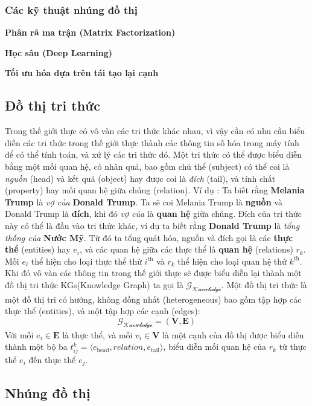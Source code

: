 \subsubsection{Các kỹ thuật nhúng đồ thị}

\textbf{Phân rã ma trận (Matrix Factorization)}

\textbf{Học sâu (Deep Learning)}

\textbf{Tối ưu hóa dựa trên tái tạo lại cạnh}

\subsection{Đồ thị tri thức}

Trong thế giới thực có vô vàn các tri thức khác nhau, vì vậy cần có nhu cầu biểu diễn các tri thức trong thế giới thực thành các thông tin số hóa trong máy tính để có thể tính toán, và xử lý các tri thức đó. Một tri thức có thể được biểu diễn bằng một mối quan hệ, có nhân quả, bao gồm chủ thể (subject) có thể coi là \textit{nguồn} (head) và kết quả (object) hay được coi là \textit{đích} (tail), và tính chất (property) hay mối quan hệ giữa chúng (relation). Ví dụ : Ta biết rằng \textbf{Melania Trump} là \textit{vợ của} \textbf{Donald Trump}. Ta sẽ coi Melania Trump là \textbf{nguồn} và Donald Trump là \textbf{đích}, khi đó \textit{vợ của} là \textbf{quan hệ} giữa chúng. Đích của tri thức này có thể là đầu vào tri thức khác, ví dụ ta biết rằng \textbf{Donald Trump} là \textit{tổng thống của} \textbf{Nước Mỹ}. Từ đó ta tổng quát hóa, nguồn và đích  gọi là các \textbf{thực thể} (entities) hay $e_i$, và các quan hệ giữa các thực thể là \textbf{quan hệ} (relations) $r_k$. Mỗi $e_i$ thể hiện cho loại thực thể thứ $i^\text{th}$ và $r_k$ thể hiện cho loại quan hệ thứ $k^\text{th}$. Khi đó vô vàn các thông tin trong thế giới thực sẽ được biểu diễn lại thành một đồ thị tri thức KGs(Knowledge Graph) ta gọi là $\mathcal{G_{\text{Knowledge}}}$. Một đồ thị tri thức là một đồ thị tri có hướng, không đồng nhất (heterogeneous) bao gồm tập hợp các thực thể (entities), và một tập hợp các cạnh (edges):
$$
\mathcal{G_{\text{Knowledge}}} = (\mathbf{V},\mathbf{E})
$$
Với mỗi $e_i \in \mathbf{E}$ là thực thể, và mỗi $v_i \in \mathbf{V}$ là một cạnh của đồ thị được biểu diễn thành một bộ ba $t_{ij}^k = \langle e_\text{head}, relation, e_\text{tail} \rangle$, biểu diễn mối quan hệ của $r_k$ từ thực thể $e_i$ đến thực thể $e_j$.

\subsection{Nhúng đồ thị}

